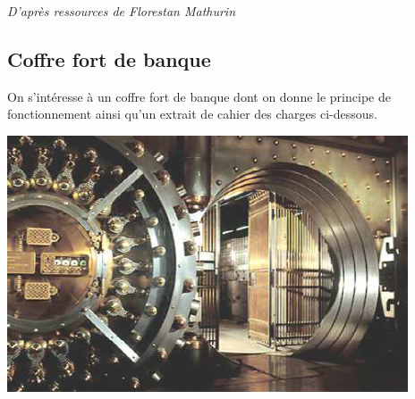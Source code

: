 \documentclass[10pt]{article}
\begin{document}



\vspace{.5cm}
\begin{flushright}
\textit{D'après ressources de Florestan Mathurin}
\end{flushright}



\subsection*{Coffre fort de banque}

\setcounter{subparagraph}{0}

\begin{minipage}[c]{.45\linewidth}

On s'intéresse à un coffre fort de banque dont on donne le principe de fonctionnement ainsi qu'un extrait de cahier des charges ci-dessous.

\end{minipage}
\hfill
\begin{minipage}[c]{.45\linewidth}
\begin{center}
\includegraphics[width=.9\textwidth]{png/fig3}
\end{center}
\end{minipage}
\end{document}
